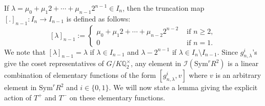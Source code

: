 \documentclass[11pt, reqno]{amsart}
\numberwithin{equation}{section}
\newcommand\Q{\mathbb{Q}}
\newcommand{\F}{\mathbb{F}}
\newcommand\Sym{{\mathrm {Sym}}}
\theoremstyle{definition}
\theoremstyle{remark}
\theoremstyle{definition}
\theoremstyle{remark}
\theoremstyle{remark}
\begin{document}
%
%

If $\lambda=\mu_{0}+ \mu_{1}2+\cdots + \mu_{n-1}2^{n-1} \in I_{n}$, then the truncation map $[.]_{n-1}: I_{n} \to I_{n-1}$ is defined as follows: $$[\lambda]_{n-1} := \begin{cases}
\mu_{0}+ \mu_{1}2+\cdots + \mu_{n-2}2^{n-2} & \text{ if } n\geq 2,\\
0 & \text{ if } n=1.
\end{cases}$$
We note that $[\lambda]_{n-1} = \lambda$ if $\lambda \in I_{n-1}$ and $\lambda-2^{n-1}$ if $\lambda\in I_{n}\setminus I_{n-1}$.
Since $g_{n,\lambda}^{i}$'s give the coset representatives of $G/K\Q_{2}^{\times}$, any element in $\mathcal{I}(\Sym^{r}R^2)$ is a linear combination of elementary functions of the form $\left[g_{n,\lambda}^{i}, v\right]$ where $v$ is an arbitrary element in $\Sym^{r}R^2$ and $i \in \{0,1\}$. We will now state a lemma giving the explicit action of $T^{+}$ and $T^{-}$ on these elementary functions.
\end{document}
